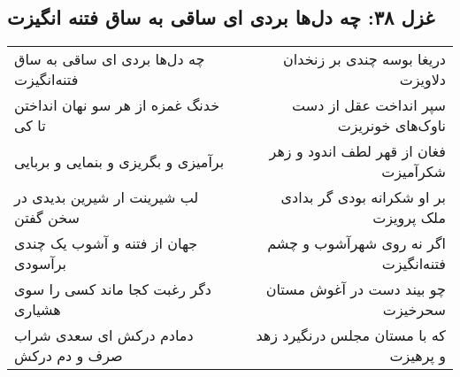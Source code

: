 \begin{center}
\section*{غزل ۳۸: چه دل‌ها بردی ای ساقی به ساق فتنه انگیزت}
\label{sec:038}
\begin{longtable}{l p{0.5cm} r}
چه دل‌ها بردی ای ساقی به ساق فتنه‌انگیزت
&&
دریغا بوسه چندی بر زنخدان دلاویزت
\\
خدنگ غمزه از هر سو نهان انداختن تا کی
&&
سپر انداخت عقل از دست ناوک‌های خونریزت
\\
برآمیزی و بگریزی و بنمایی و بربایی
&&
فغان از قهر لطف اندود و زهر شکرآمیزت
\\
لب شیرینت ار شیرین بدیدی در سخن گفتن
&&
بر او شکرانه بودی گر بدادی ملک پرویزت
\\
جهان از فتنه و آشوب یک چندی برآسودی
&&
اگر نه روی شهرآشوب و چشم فتنه‌انگیزت
\\
دگر رغبت کجا ماند کسی را سوی هشیاری
&&
چو بیند دست در آغوش مستان سحرخیزت
\\
دمادم درکش ای سعدی شراب صرف و دم درکش
&&
که با مستان مجلس درنگیرد زهد و پرهیزت
\\
\end{longtable}
\end{center}

